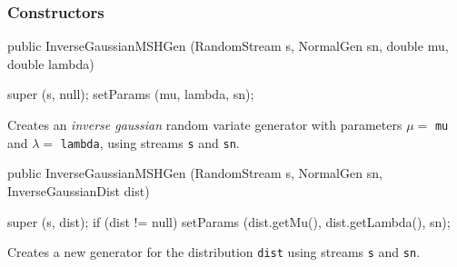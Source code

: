\subsubsection* {Constructors}
\begin{code}

   public InverseGaussianMSHGen (RandomStream s, NormalGen sn,
                                 double mu, double lambda) \begin{hide} {
      super (s, null);
      setParams (mu, lambda, sn);
   }\end{hide}
\end{code} 
\begin{tabb}  Creates an \emph{inverse gaussian} random variate generator with
 parameters $\mu = $ \texttt{mu} and $\lambda= $ \texttt{lambda},
 using streams \texttt{s} and \texttt{sn}.
\end{tabb}
\begin{code}
 
   public InverseGaussianMSHGen (RandomStream s, NormalGen sn,
                                 InverseGaussianDist dist) \begin{hide} {
      super (s, dist);
      if (dist != null)
         setParams (dist.getMu(), dist.getLambda(), sn);
   }\end{hide}
\end{code}
\begin{tabb}  Creates a new generator for the distribution \texttt{dist}
 using streams \texttt{s} and \texttt{sn}.
\end{tabb}

